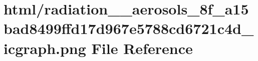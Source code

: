 \hypertarget{radiation____aerosols__8f__a15bad8499ffd17d967e5788cd6721c4d__icgraph_8png}{}\section{html/radiation\+\_\+\+\_\+aerosols\+\_\+8f\+\_\+a15bad8499ffd17d967e5788cd6721c4d\+\_\+icgraph.png File Reference}
\label{radiation____aerosols__8f__a15bad8499ffd17d967e5788cd6721c4d__icgraph_8png}
